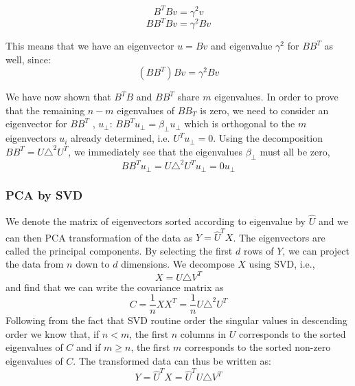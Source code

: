 \documentclass[12pt,twoside]{article}
\begin{document}
\begin{equation}
B^{T}Bv = \gamma^2v
\end{equation}
\begin{equation}
BB^{T}Bv = \gamma^2Bv
\end{equation}

\bigbreak
This means that we have an eigenvector $u = Bv$ and eigenvalue $\gamma^2$ for $BB^{T}$ as well, since:
\begin{equation}
(BB^{T})Bv = \gamma^2Bv
\end{equation}

\bigbreak
We have now shown that $B^{T}B$ and $BB^{T}$ share $m$ eigenvalues.
\bigbreak
In order to prove that the remaining $n − m$ eigenvalues of $BB_{T}$ is zero, we need to consider an eigenvector for  $BB^{T}$ , $u_{\perp}$: $BB^{T} u_{\perp} = \beta_{\perp} u_{\perp}$ which is orthogonal to the $m$ eigenvectors $u_{i}$ already determined, i.e. $U^{T} u_{\perp} = 0$. Using the decomposition $BB^{T} = U\triangle^2U^{T}$, we immediately see that the eigenvalues $\beta_{\perp}$ must all be zero,
\begin{equation}
BB^{T} u_{\perp} = U\triangle^2U^{T} u_{\perp} = 0 u_{\perp}
\end{equation}
\bigbreak
\subsubsection{PCA by SVD}
\bigbreak
We denote the matrix of eigenvectors sorted according to eigenvalue by $\hat{U}$ and we can then PCA transformation of the data as $Y = \hat{U}^{T}X$. The eigenvectors are called the principal components. By selecting the first $d$ rows of $Y$, we can project the data from $n$ down to $d$ dimensions.
\bigbreak
We decompose $X$ using SVD, i.e.,
\begin{equation}
X = U\triangle V^{T}
\end{equation}
\newline
and find that we can write the covariance matrix as
\begin{equation}
C = \frac{1}{n} XX^{T} = \frac{1}{n} U\triangle^2U^{T}
\end{equation}
\bigbreak
Following from the fact that SVD routine order the singular values in descending order we know that, if $n < m$, the first $n$ columns in $U$ corresponds to the sorted eigenvalues of $C$ and if $m \geq n$, the first $m$ corresponds to the sorted non-zero eigenvalues of $C$. The transformed data can thus be written as:
\begin{equation}
Y = \hat{U}^{T}X = \hat{U}^{T}U\triangle V^T
\end{equation}
\end{document}
